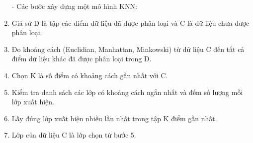 \documentclass{report}
\begin{document}
\begin{enumerate}
            \item [- ] Các bước xây dựng một mô hình KNN:
                \item Giả sử D là tập các điểm dữ liệu đã được phân loại và C là dữ liệu chưa được phân loại.
                \item Đo khoảng cách (Euclidian, Manhattan, Minkowski) từ dữ liệu C đến tất cả điểm dữ liệu khác đã được phân loại trong D.
                \item Chọn K là số điểm có khoảng cách gần nhất với C.
                \item Kiểm tra danh sách các lớp có khoảng cách ngắn nhất và đếm số lượng mỗi lớp xuất hiện.
                \item Lấy đúng lớp xuất hiện nhiều lần nhất trong tập K điểm gần nhất.
                \item Lớp của dữ liệu C là lớp chọn từ bước 5.
        \end{enumerate}
        
    \pagebreak
    
    \fontsize{16}{10}\selectfont
\end{document}
